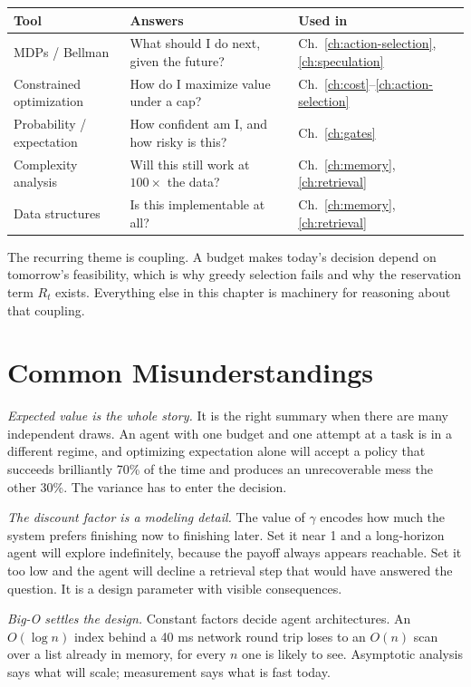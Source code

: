 \documentclass[11pt]{book}
\begin{document}
\begin{center}
\begin{tabular}{lll}
\toprule
Tool & Answers & Used in \\
\midrule
MDPs / Bellman & What should I do next, given the future? & Ch.~\ref{ch:action-selection}, \ref{ch:speculation} \\
Constrained optimization & How do I maximize value under a cap? & Ch.~\ref{ch:cost}--\ref{ch:action-selection} \\
Probability / expectation & How confident am I, and how risky is this? & Ch.~\ref{ch:gates} \\
Complexity analysis & Will this still work at $100\times$ the data? & Ch.~\ref{ch:memory}, \ref{ch:retrieval} \\
Data structures & Is this implementable at all? & Ch.~\ref{ch:memory}, \ref{ch:retrieval} \\
\bottomrule
\end{tabular}
\end{center}

The recurring theme is coupling. A budget makes today's decision depend on tomorrow's feasibility, which is why greedy selection fails and why the reservation term $R_t$ exists. Everything else in this chapter is machinery for reasoning about that coupling.

\section{Common Misunderstandings}

\textit{Expected value is the whole story.} It is the right summary when there are many independent draws. An agent with one budget and one attempt at a task is in a different regime, and optimizing expectation alone will accept a policy that succeeds brilliantly 70\% of the time and produces an unrecoverable mess the other 30\%. The variance has to enter the decision.

\textit{The discount factor is a modeling detail.} The value of $\gamma$ encodes how much the system prefers finishing now to finishing later. Set it near 1 and a long-horizon agent will explore indefinitely, because the payoff always appears reachable. Set it too low and the agent will decline a retrieval step that would have answered the question. It is a design parameter with visible consequences.

\textit{Big-O settles the design.} Constant factors decide agent architectures. An $O(\log n)$ index behind a 40 ms network round trip loses to an $O(n)$ scan over a list already in memory, for every $n$ one is likely to see. Asymptotic analysis says what will scale; measurement says what is fast today.
\end{document}
